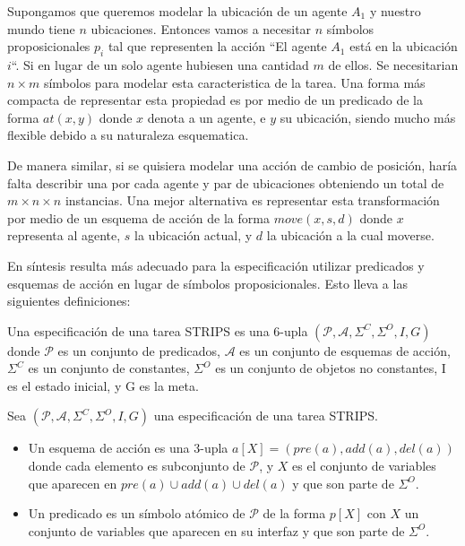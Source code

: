 Supongamos que queremos modelar la ubicación de un agente $A_1$ y nuestro mundo
tiene $n$ ubicaciones. Entonces vamos a necesitar $n$ símbolos proposicionales
$p_i$ tal que representen la acción ``El agente $A_1$ está en la ubicación
$i$``. Si en lugar de un solo agente hubiesen una cantidad $m$ de ellos. Se
necesitarian $n \times m$ símbolos para modelar esta caracteristica de la tarea.
Una forma más compacta de representar esta propiedad es por medio de un
predicado de la forma $at(x, y)$ donde $x$ denota a un agente, e $y$ su
ubicación, siendo mucho más flexible debido a su naturaleza esquematica.

De manera similar, si se quisiera modelar una acción de cambio de posición, haría falta describir una por cada agente y par de ubicaciones
obteniendo un total de $m \times n \times n$ instancias. Una mejor alternativa
es representar esta transformación por medio de un esquema de acción de la forma
$move(x, s, d)$ donde $x$ representa al agente, $s$ la ubicación actual, y $d$
la ubicación a la cual moverse.

En síntesis resulta más adecuado para la especificación utilizar predicados y
esquemas de acción en lugar de símbolos proposicionales. Esto lleva a las
siguientes definiciones:

\begin{mydef}
    Una especificación de una tarea STRIPS es una 6-upla $(\mathcal{P},
    \mathcal{A}, \Sigma^{C}, \Sigma^{O}, I, G)$  donde $\mathcal{P}$ es un
    conjunto de predicados, $\mathcal{A}$ es un conjunto de esquemas
    de acción, $\Sigma^{C}$ es un conjunto de constantes, $\Sigma^{O}$ es un
    conjunto de objetos no constantes, I es el estado inicial, y G es la meta.
\end{mydef}

\begin{mydef}
    Sea $(\mathcal{P}, \mathcal{A}, \Sigma^{C}, \Sigma^{O}, I, G)$ una
    especificación de una tarea STRIPS.

    \begin{itemize}
        \item Un esquema de acción es una 3-upla $a[X] = (pre(a), add(a),
        del(a))$ donde cada elemento es subconjunto de $\mathcal{P}$, y $X$ es el
        conjunto de variables que aparecen en $pre(a) \cup add(a) \cup del(a)$ y
        que son parte de $\Sigma^{O}$.
        \item Un predicado es un símbolo atómico de $\mathcal{P}$ de la forma
        $p[X]$ con $X$ un conjunto de variables que aparecen en su interfaz y
        que son parte de $\Sigma^{O}$.
    \end{itemize}
\end{mydef}

